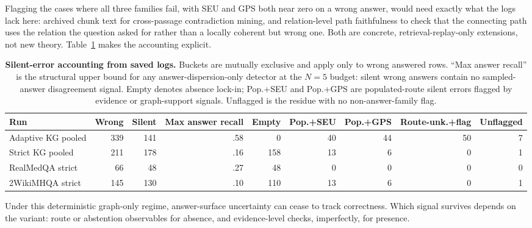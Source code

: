 Flagging the cases where all three families fail, with SEU and GPS both near
zero on a wrong answer, would need exactly what the logs lack here: archived
chunk text for cross-passage contradiction mining, and relation-level path
faithfulness to check that the connecting path uses the relation the question
asked for rather than a locally coherent but wrong one.
Both are concrete, retrieval-replay-only extensions, not new theory.
Table~\ref{tab:silent_accounting} makes the accounting explicit.

\begin{table}[t]
\centering
\scriptsize
\caption{%
  \textbf{Silent-error accounting from saved logs.}
  Buckets are mutually exclusive and apply only to wrong answered rows.
  ``Max answer recall'' is the structural upper bound for any
  answer-dispersion-only detector at the $N{=}5$ budget: silent wrong answers
  contain no sampled-answer disagreement signal.
  Empty denotes absence lock-in; Pop.+SEU and Pop.+GPS are populated-route
  silent errors flagged by evidence or graph-support signals.
  Unflagged is the residue with no non-answer-family flag.%
}
\label{tab:silent_accounting}
\setlength{\tabcolsep}{3pt}
\begin{tabular}{@{}lrrrrrrrr@{}}
\toprule
Run & Wrong & Silent & Max answer recall & Empty & Pop.+SEU & Pop.+GPS & Route-unk.+flag & Unflagged \\
\midrule
Adaptive KG pooled & 339 & 141 & .58 & 0 & 40 & 44 & 50 & 7 \\
Strict KG pooled   & 211 & 178 & .16 & 158 & 13 & 6 & 0 & 1 \\
RealMedQA strict   & 66  & 48  & .27 & 48  & 0  & 0 & 0 & 0 \\
2WikiMHQA strict   & 145 & 130 & .10 & 110 & 13 & 6 & 0 & 1 \\
\bottomrule
\end{tabular}
\end{table}
Under this deterministic graph-only regime, answer-surface uncertainty can
cease to track correctness.
Which signal survives depends on the variant: route or abstention observables
for absence, and evidence-level checks, imperfectly, for presence.

